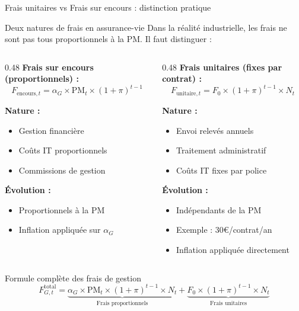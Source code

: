 \documentclass[10pt,aspectratio=169]{beamer}
\newcommand{\PM}{\text{PM}}
\begin{document}
\begin{frame}{Frais unitaires vs Frais sur encours : distinction pratique}
\begin{block}{Deux natures de frais en assurance-vie}
Dans la réalité industrielle, les frais ne sont pas tous proportionnels à la PM. Il faut distinguer :
\end{block}

\begin{columns}[T]
\begin{column}{0.48\textwidth}
\textbf{Frais sur encours (proportionnels) :}
\[
F_{\text{encours},t} = \alpha_G \times \PM_t \times (1+\pi)^{t-1}
\]

\textbf{Nature :}
\begin{itemize}
    \item Gestion financière
    \item Coûts IT proportionnels
    \item Commissions de gestion
\end{itemize}

\textbf{Évolution :}
\begin{itemize}
    \item Proportionnels à la PM
    \item Inflation appliquée sur $\alpha_G$
\end{itemize}
\end{column}
\begin{column}{0.48\textwidth}
\textbf{Frais unitaires (fixes par contrat) :}
\[
F_{\text{unitaire},t} = F_0 \times (1+\pi)^{t-1} \times N_t
\]

\textbf{Nature :}
\begin{itemize}
    \item Envoi relevés annuels
    \item Traitement administratif
    \item Coûts IT fixes par police
\end{itemize}

\textbf{Évolution :}
\begin{itemize}
    \item Indépendants de la PM
    \item Exemple : 30€/contrat/an
    \item Inflation appliquée directement
\end{itemize}
\end{column}
\end{columns}

\vspace{0.3cm}
\begin{exampleblock}{Formule complète des frais de gestion}
\[
\boxed{F_{G,t}^{\text{total}} = \underbrace{\alpha_G \times \PM_t \times (1+\pi)^{t-1} \times N_t}_{\text{Frais proportionnels}} + \underbrace{F_0 \times (1+\pi)^{t-1} \times N_t}_{\text{Frais unitaires}}}
\]
\end{exampleblock}
\end{frame}
\end{document}
